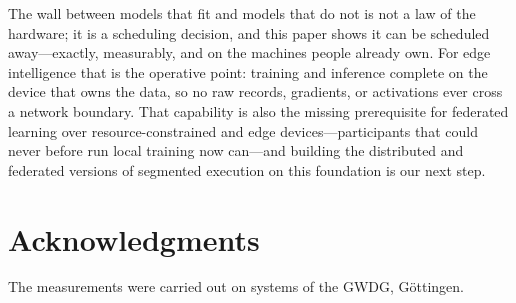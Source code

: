 \documentclass[journal]{IEEEtran}
\begin{document}
The wall between models that fit and models that do not is not a law of
the hardware; it is a scheduling decision, and this paper shows it can be
scheduled away---exactly, measurably, and on the machines people already
own. For edge intelligence that is the operative point: training and
inference complete on the device that owns the data, so no raw records,
gradients, or activations ever cross a network boundary. That capability
is also the missing prerequisite for federated learning over
resource-constrained and edge devices---participants that could never
before run local training now can---and building the distributed and
federated versions of segmented execution on this foundation is our next
step.

\section*{Acknowledgments}
The measurements were carried out on systems of the GWDG, G\"ottingen.



\end{document}
